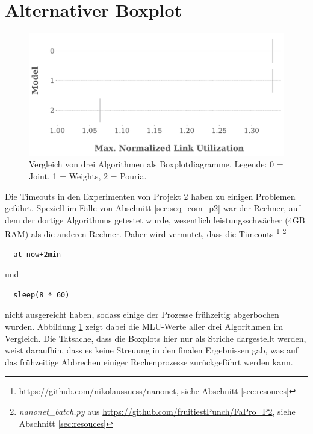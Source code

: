 \documentclass[sigconf, nonacm, review]{acmart}
\begin{document}
\section{Alternativer Boxplot}
\label{sec:alt_boxplot}
\begin{figure}
\centering
\includegraphics[width=\linewidth]{figures/pouria_boxplot_no_real_results.pdf}
\caption{Vergleich von drei Algorithmen als Boxplotdiagramme. Legende: 0 = Joint, 1 = Weights, 2 = Pouria.}
\label{fig:pouria_boxplot_no_real_results}
\end{figure}
Die Timeouts in den Experimenten von Projekt 2 haben zu einigen Problemen gef\"uhrt.
Speziell im Falle von Abschnitt \ref{sec:seq_com_p2} war der Rechner, 
auf dem der dortige Algorithmus getestet wurde,
wesentlich leistungsschw\"acher (4GB RAM) als die anderen Rechner.
Daher wird vermutet, 
dass die Timeouts
\footnote{\url{https://github.com/nikolaussuess/nanonet}, siehe Abschnitt \ref{sec:resouces}}
\footnote{\emph{nanonet\_batch.py} aus \url{https://github.com/fruitiestPunch/FaPro_P2}, siehe Abschnitt \ref{sec:resouces}}
\begin{verbatim}
  at now+2min
\end{verbatim}
und 
\begin{verbatim}
  sleep(8 * 60)
\end{verbatim}
nicht ausgereicht haben, sodass einige der Prozesse fr\"uhzeitig abgerbochen wurden.
Abbildung \ref{fig:pouria_boxplot_no_real_results} zeigt dabei die MLU-Werte aller drei Algorithmen im Vergleich.
Die Tatsache, dass die Boxplots hier nur als Striche dargestellt werden, weist daraufhin, dass es keine Streuung in den finalen Ergebnissen gab,
was auf das fr\"uhzeitige Abbrechen einiger Rechenprozesse zur\"uckgef\"uhrt werden kann.
\end{document}
